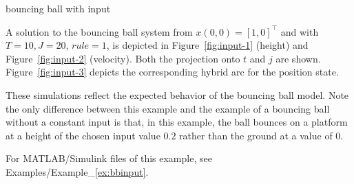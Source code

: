 \begin{example}{bouncing ball with input}
\label{scr:f}

\label{scr:C}

\label{scr:g}

\label{scr:D}

A solution to the bouncing ball system from $x(0,0)=[1,0]^\top$ and with $T=10, J=20$, $rule =1$, is
depicted in Figure~\ref{fig:input-1} (height) and Figure~\ref{fig:input-2} (velocity).  Both the projection
onto $t$ and $j$ are shown. Figure~\ref{fig:input-3} depicts the corresponding hybrid arc for the position state.

These simulations reflect the expected behavior of the bouncing ball model. Note the only
difference between this example and the example of a bouncing ball without a constant input is that, in this example, the ball bounces on a platform at a height of the chosen input value $0.2$ rather than the ground at a value of $0$.

For MATLAB/Simulink files of this example, see Examples/Example\_\ref{ex:bbinput}.

\end{example}
